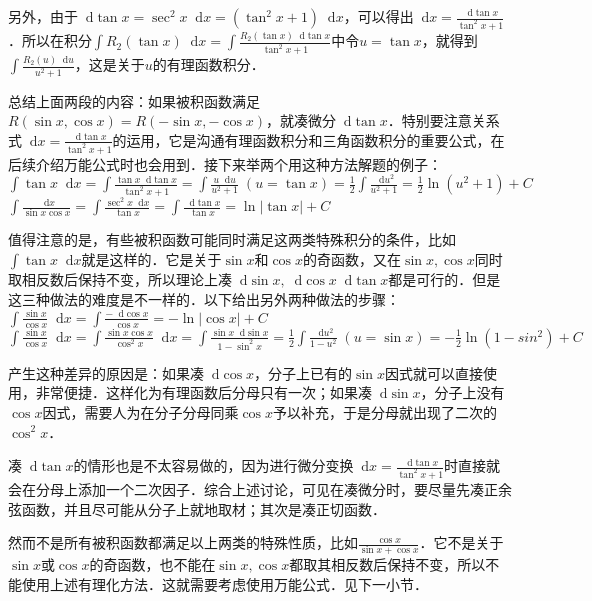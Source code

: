 \documentclass{ctexbook}
\newcommand*{\dif}{\mathop{}\!\mathrm{d}}
\begin{document}
另外，由于$\dif{\tan{x}}=\sec^{2}{x}\dif{x}=\left(\tan^{2}{x}+1\right)\dif{x}$，可以得出$\dif{x}=\frac{\dif{\tan{x}}}{\tan^{2}{x}+1}$．所以在积分$\int R_{2}\left(\tan{x}\right)\dif{x}=\int\frac{R_{2}\left(\tan{x}\right)\dif{\tan{x}}}{\tan^{2}{x}+1}$中令$u=\tan{x}$，就得到$\int\frac{R_{2}\left(u\right)\dif{u}}{u^{2}+1}$，这是关于$u$的有理函数积分．\par
总结上面两段的内容：如果被积函数满足$R\left(\sin{x},\cos{x}\right)=R\left(-\sin{x},-\cos{x}\right)$，就凑微分$\dif{\tan{x}}$．特别要注意关系式$\dif{x}=\frac{\dif{\tan{x}}}{\tan^{2}{x}+1}$的运用，它是沟通有理函数积分和三角函数积分的重要公式，在后续介绍万能公式时也会用到．接下来举两个用这种方法解题的例子：\\
$\int\tan{x}\dif{x}=\int\frac{\tan{x}\dif{\tan{x}}}{\tan^{2}{x}+1}=\int\frac{u\dif{u}}{u^{2}+1}\;\left(u=\tan{x}\right)=\frac{1}{2}\int\frac{\dif{u}^{2}}{u^{2}+1}=\frac{1}{2}\ln{\left(u^{2}+1\right)}+C$\\
$\int\frac{\dif{x}}{\sin{x}\cos{x}}=\int\frac{\sec^{2}{x}\dif{x}}{\tan{x}}=\int\frac{\dif{\tan{x}}}{\tan{x}}=\ln{|\tan{x}|}+C$\par
值得注意的是，有些被积函数可能同时满足这两类特殊积分的条件，比如$\int\tan{x}\dif{x}$就是这样的．它是关于$\sin{x}$和$\cos{x}$的奇函数，又在$\sin{x},\cos{x}$同时取相反数后保持不变，所以理论上凑$\dif{\sin{x}},\dif{\cos{x}}\dif{\tan{x}}$都是可行的．但是这三种做法的难度是不一样的．以下给出另外两种做法的步骤：\\
$\int\frac{\sin{x}}{\cos{x}}\dif{x}=\int\frac{-\dif{\cos{x}}}{\cos{x}}=-\ln{|\cos{x}|}+C$\\
$\int\frac{\sin{x}}{\cos{x}}\dif{x}=\int\frac{\sin{x}\cos{x}}{\cos^{2}{x}}\dif{x}=\int\frac{\sin{x}\dif{\sin{x}}}{1-\sin^{2}{x}}=\frac{1}{2}\int\frac{\dif{u}^{2}}{1-u^{2}}\;\left(u=\sin{x}\right)=-\frac{1}{2}\ln{\left(1-sin^{2}\right)}+C$\par
产生这种差异的原因是：如果凑$\dif{\cos{x}}$，分子上已有的$\sin{x}$因式就可以直接使用，非常便捷．这样化为有理函数后分母只有一次；如果凑$\dif{\sin{x}}$，分子上没有$\cos{x}$因式，需要人为在分子分母同乘$\cos{x}$予以补充，于是分母就出现了二次的$\cos^{2}{x}$．\par
凑$\dif{\tan{x}}$的情形也是不太容易做的，因为进行微分变换$\dif{x}=\frac{\dif{\tan{x}}}{\tan^{2}{x}+1}$时直接就会在分母上添加一个二次因子．综合上述讨论，可见在凑微分时，要尽量先凑正余弦函数，并且尽可能从分子上就地取材；其次是凑正切函数．\par
然而不是所有被积函数都满足以上两类的特殊性质，比如$\frac{\cos{x}}{\sin{x}+\cos{x}}$．它不是关于$\sin{x}$或$\cos{x}$的奇函数，也不能在$\sin{x},\cos{x}$都取其相反数后保持不变，所以不能使用上述有理化方法．这就需要考虑使用万能公式．见下一小节．\par
\end{document}
